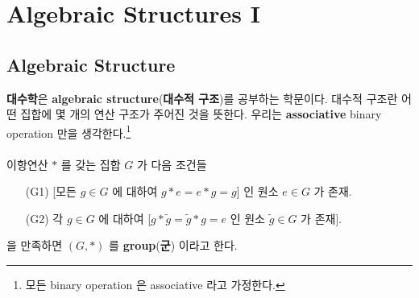 \section{Algebraic Structures I}
\subsection{Algebraic Structure}
\textbf{대수학}은 \textbf{algebraic structure}(\textbf{대수적 구조})를 공부하는 학문이다. 대수적 구조란 어떤 집합에 몇 개의 연산 구조가 주어진 것을 뜻한다. 우리는 \textbf{associative} binary operation 만을 생각한다.\footnote{모든 binary operation 은 associative 라고 가정한다.}\\
\\
 이항연산 $\ast$ 를 갖는 집합 $G$ 가 다음 조건들
\begin{enumerate}
	\item[\sffamily (G1)] [모든 $g\in G$ 에 대하여 $g\ast e=e\ast g = g$] 인 원소 $e\in G$ 가 존재.
	\item[\sffamily (G2)] 각 $g \in G$ 에 대하여 [$g\ast \tilde{g} = \tilde{g}\ast g = e$ 인 원소 $\tilde{g}\in G$ 가 존재].
\end{enumerate}
을 만족하면 $(G, \ast)$ 를 \textbf{group}(\textbf{군}) 이라고 한다.\\

